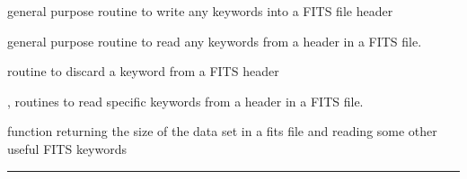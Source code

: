 \begin{related}
  \begin{sulist}{} %
  \item[\htmlref{add\_card}{sub:add_card}] general purpose routine to write any keywords into a FITS
  file header
  \item[\htmlref{get\_card}{sub:get_card}] general purpose routine to read any keywords from a header in a FITS file.
  \item[\htmlref{del\_card}{sub:del_card}] routine to discard a keyword from a FITS header
  \item[\htmlref{read\_par}{sub:read_par}, \htmlref{number\_of\_alms}{sub:number_of_alms}] routines to read specific keywords from a
  header in a FITS file.
  \item[\htmlref{getsize\_fits}{sub:getsize_fits}] function returning the size of the data set in a fits
  file and reading some other useful FITS keywords
  \end{sulist}
\end{related}

\rule{\hsize}{2mm}

\newpage
